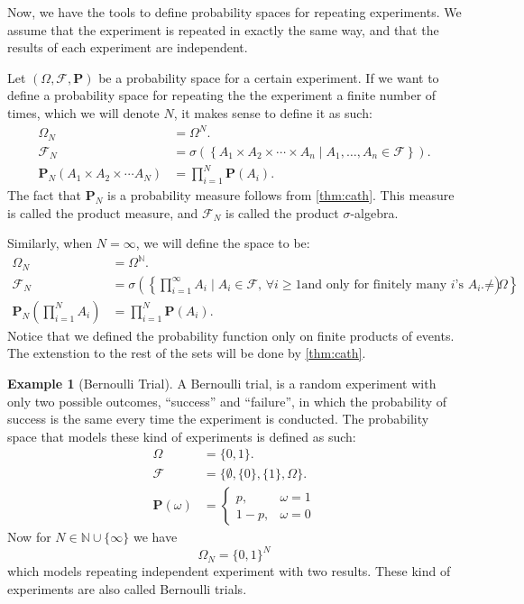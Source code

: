 \documentclass[11pt,a4paper]{article}
\theoremstyle{definition}
\newtheorem{example}{Example}[section]
\theoremstyle{plain}
\newcommand{\N}{\mathbb{N}}
\newcommand{\set}[2]{ \left\{ #1 \mid #2 \right\} }
\begin{document}
  Now, we have the tools to define probability spaces for repeating experiments.
  We assume that the experiment is repeated in exactly the same way, and that
  the results of each experiment are independent.

  Let $(\Omega, \mathcal F, \mathbf P)$ be a probability space for a certain
  experiment. If we want to define a probability space for repeating the
  the experiment a finite number of times, which we will denote $N$, it makes
  sense to define it as such:
  \begin{align*}
    \Omega_N &= \Omega^N. \\
    \mathcal F_N &= \sigma\left(\set{A_1 \times A_2 \times \cdots \times A_n}
    {A_1,\dots,A_n \in \mathcal F}\right). \\
    \mathbf P_N\left(A_1 \times A_2 \times \cdots A_N\right) &= 
    \prod_{i=1}^{N} \mathbf P(A_i).
  \end{align*}
  The fact that $\mathbf P_N$ is a probability measure follows from 
  \autoref{thm:cath}. This measure is called the product measure, and 
  $\mathcal F_N$ is called the product $\sigma$-algebra.

  Similarly, when $N=\infty$, we will define the space to be:
  \begin{align*}
    \Omega_N &= \Omega^{\N}. \\
    \mathcal F_N &= \sigma\left(\set{\prod_{i=1}^{\infty}{A_i}}
    {A_i \in \mathcal F, \, \forall i \geq 1 \text{and only for finitely many
    $i$'s } A_i \neq \Omega}\right). \\
    \mathbf P_N\left(\prod_{i=1}^{N}{A_i}\right) &= 
    \prod_{i=1}^{N} \mathbf P(A_i).
  \end{align*}
  Notice that we defined the probability function only on finite products of
  events. The extenstion to the rest of the sets will be done by 
  \autoref{thm:cath}.

  \begin{example}[Bernoulli Trial]
    A Bernoulli trial, is a random experiment with only two possible outcomes,
    ``success'' and ``failure'', in which the probability of success is the 
    same every time the experiment is conducted. The probability space that
    models these kind of experiments is defined as such:
    \begin{align*}
      \Omega &= \{0, 1\}. \\
      \mathcal F &= \{\emptyset, \{0\}, \{1\}, \Omega\}. \\
      \mathbf P(\omega) &=
      \begin{cases}
        p, &\omega = 1 \\
        1-p, &\omega= 0
      \end{cases}
    \end{align*}
    Now for $N \in \N \cup \{\infty\}$ we have
    \[ \Omega_N = \{0, 1\}^N \]
    which models repeating independent experiment with two results.
    These kind of experiments are also called Bernoulli trials.


  \end{example}
\end{document}
